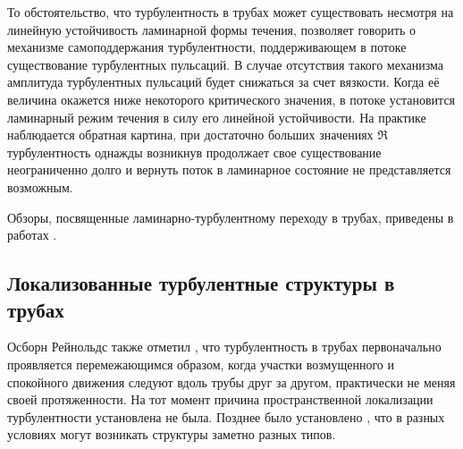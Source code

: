 То обстоятельство, что турбулентность в трубах может существовать несмотря на линейную устойчивость ламинарной формы течения, позволяет говорить о механизме самоподдержания турбулентности, поддерживающем в потоке существование турбулентных пульсаций. В случае отсутствия такого механизма амплитуда турбулентных пульсаций будет снижаться за счет вязкости. Когда её величина окажется ниже некоторого критического значения, в потоке установится ламинарный режим течения в силу его линейной устойчивости. На практике наблюдается обратная картина, при достаточно больших значениях $\Re$ турбулентность однажды возникнув продолжает свое существование неограниченно долго и вернуть поток в ламинарное состояние не представляется возможным. 

Обзоры, посвященные ламинарно-турбулентному переходу в трубах, приведены в работах \cite{Kerswell2005, Manneville2016, Kreilos2014, Barkley2016}. 


	\subsection{Локализованные турбулентные структуры в трубах}

Осборн Рейнольдс также отметил \cite{Reynolds1883}, что турбулентность в трубах первоначально проявляется перемежающимся образом, когда участки возмущенного и спокойного движения следуют вдоль трубы друг за другом, практически не меняя своей протяженности. На тот момент причина пространственной локализации турбулентности установлена не была. Позднее было установлено \cite{Lindgren1969, Wygnanski1973, Wygnanski1975, Bandyopadhyay1986, Darbyshire1995, vanDoorne2009}, что в разных условиях могут возникать структуры заметно разных типов.

